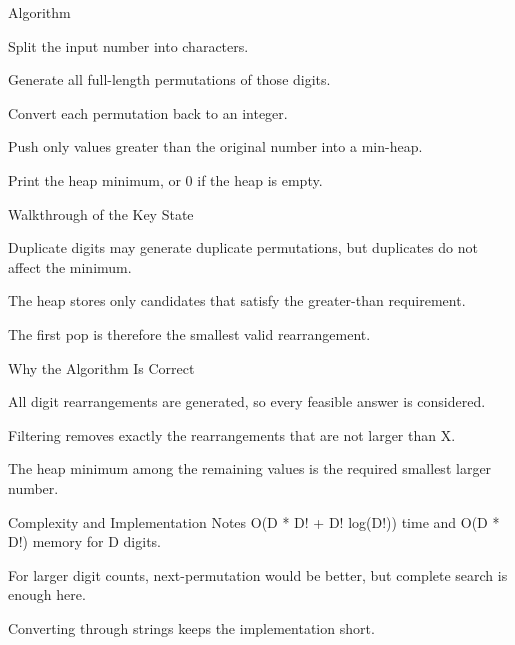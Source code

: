 \documentclass[aspectratio=169,11pt]{beamer}
\begin{document}
\begin{frame}{Algorithm}
\begin{tightitemize}
  \item Split the input number into characters.
  \item Generate all full-length permutations of those digits.
  \item Convert each permutation back to an integer.
  \item Push only values greater than the original number into a min-heap.
  \item Print the heap minimum, or 0 if the heap is empty.
\end{tightitemize}
\end{frame}

\begin{frame}{Walkthrough of the Key State}
\begin{tightitemize}
  \item Duplicate digits may generate duplicate permutations, but duplicates do not affect the minimum.
  \item The heap stores only candidates that satisfy the greater-than requirement.
  \item The first pop is therefore the smallest valid rearrangement.
\end{tightitemize}
\end{frame}

\begin{frame}{Why the Algorithm Is Correct}
\begin{tightitemize}
  \item All digit rearrangements are generated, so every feasible answer is considered.
  \item Filtering removes exactly the rearrangements that are not larger than X.
  \item The heap minimum among the remaining values is the required smallest larger number.
\end{tightitemize}
\end{frame}

\begin{frame}{Complexity and Implementation Notes}
\small
{} O(D * D! + D! log(D!)) time and O(D * D!) memory for D digits.

\vspace{0.3cm}
\begin{tightitemize}
  \item For larger digit counts, next-permutation would be better, but complete search is enough here.
  \item Converting through strings keeps the implementation short.
\end{tightitemize}
\end{frame}
\end{document}
